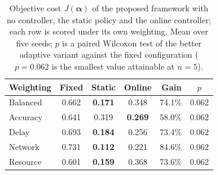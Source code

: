 \begin{table}[!t]\centering
\caption{Objective cost $J(\boldsymbol{\alpha})$ of the proposed framework with no controller, the static policy and the online controller; each row is scored under its own weighting. Mean over five seeds; $p$ is a paired Wilcoxon test of the better adaptive variant against the fixed configuration ($p=0.062$ is the smallest value attainable at $n=5$).}
\label{tab:modes}
\begin{tabular}{lcccrc}\toprule
Weighting & Fixed & Static & Online & Gain & $p$ \\\midrule
Balanced & 0.662 & \textbf{0.171} & 0.348 & 74.1\% & 0.062 \\
Accuracy & 0.641 & 0.319 & \textbf{0.269} & 58.0\% & 0.062 \\
Delay & 0.693 & \textbf{0.184} & 0.256 & 73.4\% & 0.062 \\
Network & 0.731 & \textbf{0.112} & 0.221 & 84.6\% & 0.062 \\
Resource & 0.601 & \textbf{0.159} & 0.368 & 73.6\% & 0.062 \\
\bottomrule\end{tabular}\end{table}
